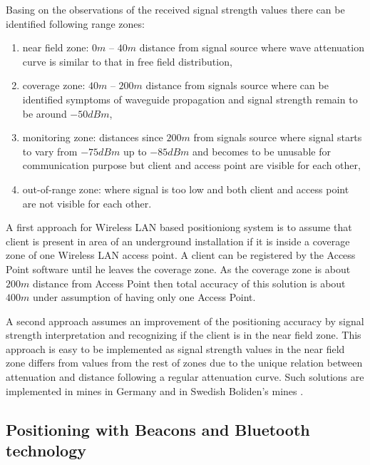 \documentclass[../main.tex]{subfiles}
\begin{document}
Basing on the observations of the received signal strength values there can be identified following range zones\cite{Thesis_CM}:
\begin{enumerate}
	\item near field zone: $0m$ -- $40m$ distance from signal source where wave attenuation curve is similar to that in free field distribution,
	\item coverage zone: $40m$ -- $200m$ distance from signals source where can be identified symptoms of waveguide propagation and signal strength remain to be around $-50 dBm$,
	\item monitoring zone: distances since $200m$ from signals source where signal starts to vary from $-75dBm$ up to $-85 dBm$ and becomes to be unusable for communication purpose but client and access point are visible for each other,
	\item out-of-range zone: where signal is too low and both client and access point are not visible for each other.
\end{enumerate}

A first approach for Wireless LAN based positioniong system is to assume that client is present in area of an underground installation if it is inside a coverage zone of one Wireless LAN access point. A client can be registered by the Access Point software until he leaves the coverage zone. As the coverage zone is about $200m$  distance from Access Point then total accuracy of this solution is about $400 m$ under assumption of having only one Access Point.

A second approach assumes an improvement of the positioning accuracy by signal strength interpretation and recognizing if the client is in the near field zone. This approach is easy to be implemented as signal strength values in the near field zone differs from values from the rest of zones due to the unique relation between attenuation and distance following a regular attenuation curve. Such solutions are implemented in mines in Germany \cite{Thesis_CM} and in Swedish Boliden's mines \cite{thesis_tablet_positioning}.





\subsection{Positioning with Beacons and Bluetooth technology} %
\label{sec:positioning_with_beacons_and_bluetooth_technology}
\end{document}

